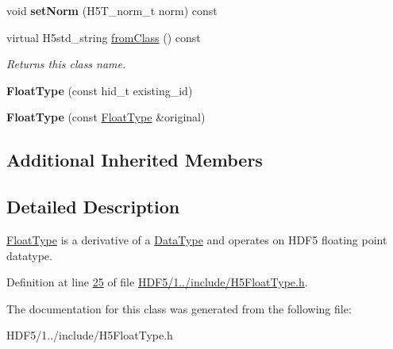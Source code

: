 \begin{DoxyCompactItemize}
\mbox{\label{class_h5_1_1_float_type_a95e74b13cee057ad3cf6b500fbb96059}} 
void {\bfseries set\+Norm} (H5\+T\+\_\+norm\+\_\+t norm) const
\item 
\mbox{\label{class_h5_1_1_float_type_a5977cef7ad7a91fa7b922672cab515f7}} 
virtual H5std\+\_\+string \hyperlink{class_h5_1_1_float_type_a5977cef7ad7a91fa7b922672cab515f7}{from\+Class} () const
\begin{DoxyCompactList}\small\item\em Returns this class name. \end{DoxyCompactList}\item 
\mbox{\label{class_h5_1_1_float_type_a786d4ff293ea19bb39b3f35c29f321e2}} 
{\bfseries Float\+Type} (const hid\+\_\+t existing\+\_\+id)
\item 
\mbox{\label{class_h5_1_1_float_type_a422f60673e35a4044afb7b4f2cabf204}} 
{\bfseries Float\+Type} (const \hyperlink{class_h5_1_1_float_type}{Float\+Type} \&original)
\end{DoxyCompactItemize}
\subsection*{Additional Inherited Members}


\subsection{Detailed Description}
\hyperlink{class_h5_1_1_float_type}{Float\+Type} is a derivative of a \hyperlink{class_h5_1_1_data_type}{Data\+Type} and operates on H\+D\+F5 floating point datatype. 

Definition at line \hyperlink{_h_d_f5_21_810_81_2include_2_h5_float_type_8h_source_l00025}{25} of file \hyperlink{_h_d_f5_21_810_81_2include_2_h5_float_type_8h_source}{H\+D\+F5/1../include/\+H5\+Float\+Type.\+h}.



The documentation for this class was generated from the following file\+:\begin{DoxyCompactItemize}
\item 
H\+D\+F5/1../include/\+H5\+Float\+Type.\+h\end{DoxyCompactItemize}
